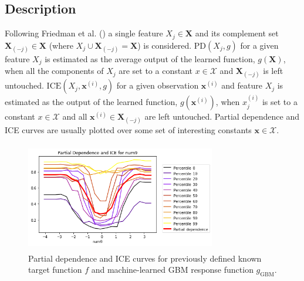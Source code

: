 \documentclass{article}
\begin{document}
\subsection{Description}
	
Following Friedman et al. (\citeyear{esl}) a single feature $X_j \in \mathbf{X}$ and its complement set $\mathbf{X}_{(-j)} \in \mathbf{X}$ (where $X_j \cup \mathbf{X}_{(-j)} = \mathbf{X}$) is considered. $\text{PD}(X_j, g)$ for a given feature $X_j$ is estimated as the average output of the learned function, $g(\mathbf{X})$, when all the components of $X_j$ are set to a constant $x \in \mathcal{X}$ and $\mathbf{X}_{(-j)}$ is left untouched. $\text{ICE}(X_j, \mathbf{x}^{(i)}, g)$ for a given observation $\mathbf{x}^{(i)}$ and feature $X_j$ is estimated as the output of the learned function, $g(\mathbf{x}^{(i)})$, when $x^{(i)}_j$ is set to a constant $x \in \mathcal{X}$ and all $\mathbf{x}^{(i)} \in \mathbf{X}_{(-j)}$ are left untouched. Partial dependence and ICE curves are usually plotted over some set of interesting constants $\mathbf{x} \in \mathcal{X}$. 

\begin{figure}[htb]
	\begin{center}
		\includegraphics[height=135pt, width=235pt]{img/figure_4.png}
		\caption{Partial dependence and ICE curves for previously defined known target function $f$ and machine-learned GBM response function $g_{\text{GBM}}$.}
		\label{fig:pdp_ice}
	\end{center}
\end{figure}
\end{document}
